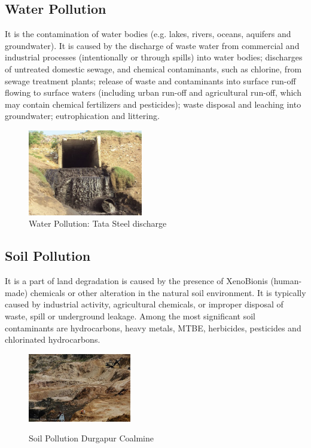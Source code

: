 \subsection{Water Pollution}
It is the contamination of water bodies (e.g. lakes, rivers, oceans, aquifers and groundwater). It is caused by the discharge of waste water from commercial and industrial processes (intentionally or through spills) into water bodies; discharges of untreated domestic sewage, and chemical contaminants, such as chlorine, from sewage treatment plants; release of waste and contaminants into surface run-off flowing to surface waters (including urban run-off and agricultural run-off, which may contain chemical fertilizers and pesticides); waste disposal and leaching into groundwater; eutrophication and littering.

\begin{figure}[h]
 \centering
  \includegraphics[width=50mm]{water.jpg}
  \caption{Water Pollution: Tata Steel discharge \cite{3}}
  \label{fig:Water Pollution: Tata Steel discharge}
\end{figure}

\subsection{Soil Pollution}
It is a part of land degradation is caused by the presence of XenoBionis (human-made) chemicals or other alteration in the natural soil environment. It is typically caused by industrial activity, agricultural chemicals, or improper disposal of waste, spill or underground leakage. Among the most significant soil contaminants are hydrocarbons, heavy metals, MTBE, herbicides, pesticides and chlorinated hydrocarbons.


\begin{figure}[h]
\centering
\includegraphics[width=0.4\textwidth]{./soil}\\[0.1in]
\label{Soil pollution: Durgapur coalmine}
 \caption{Soil Pollution Durgapur Coalmine \cite{4}}
 \label{soil pollution}
\end{figure}



